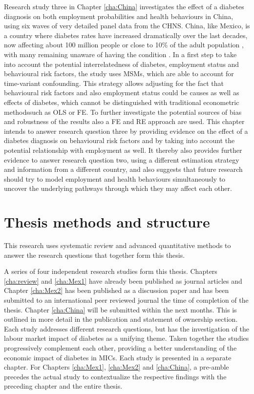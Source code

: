 Research study three in Chapter \ref{cha:China} investigates the effect of a diabetes diagnosis on both employment probabilities and health behaviours in China, using six waves of very detailed panel data from the \ac{CHNS}. China, like Mexico, is a country where diabetes rates have increased dramatically over the last decades, now affecting about 100 million people or close to 10\% of the adult population \parencite{Risk2016}, with many remaining unaware of having the condition \parencite{Wang2015}. In a first step to take into account the potential interrelatedness of diabetes, employment status and behavioural risk factors, the study uses \acp{MSM}, which are able to account for time-variant confounding. This strategy allows adjusting for the fact that behavioural risk factors and also employment status could be causes as well as effects of diabetes, which cannot be distinguished with traditional econometric methods\DIFaddbegin \DIFadd{, }\DIFaddend such as \ac{OLS} or \ac{FE}. To further investigate the potential sources of bias and robustness of the results also a \ac{FE} and \ac{RE} approach are used. This chapter intends to answer research question three by providing evidence on the effect of a diabetes diagnosis on behavioural risk factors and by taking into account the potential relationship with employment as well. It thereby also provides further evidence to answer research question two, using a different estimation strategy and information from a different country, and also suggests that future research should try to model employment and health behaviours simultaneously to uncover the underlying pathways through which they may affect each other. 


\section{Thesis methods and structure}

This research uses systematic review and advanced quantitative methods to answer the research questions that together form this thesis.

A series of four independent research studies form this thesis. Chapters \ref{cha:review} and \ref{cha:Mex1} have already been published as journal articles and Chapter \ref{cha:Mex2} has been published as a discussion paper and has been submitted to an international peer reviewed journal the time of completion of the thesis. Chapter \ref{cha:China} will be submitted within the next months. This is outlined in more detail in the publication and statement of ownership section. Each study addresses different research questions, but has the investigation of the labour market impact of diabetes as a unifying theme. Taken together the studies progressively complement each other, providing a better understanding of the economic impact of diabetes in \acp{MIC}. Each study is presented in a separate chapter. For Chapters \ref{cha:Mex1}, \ref{cha:Mex2} and \ref{cha:China}, a pre-amble precedes the actual study to contextualize the respective findings with the preceding chapter and the entire thesis.


